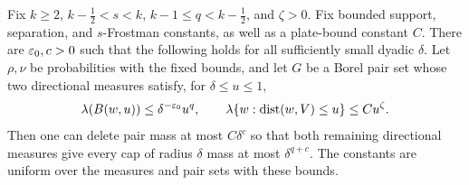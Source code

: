 \begin{lemma}\label{prep:one-scale}
Fix $k\ge2$, $k-\tfrac12<s<k$, $k-1\le q<k-\tfrac12$,
and $\zeta>0$. Fix bounded support, separation, and $s$-Frostman
constants, as well as a plate-bound constant $C$. There are $\varepsilon_0,c>0$
such that the following holds for
all sufficiently small dyadic $\delta$. Let $\rho,\nu$ be probabilities
with the fixed bounds, and let $G$ be a Borel pair set whose two
directional measures satisfy, for $\delta\le u\le1$,
\[
 \lambda(B(w,u))\le\delta^{-\varepsilon_0}u^q,
 \qquad
 \lambda\{w:\operatorname{dist}(w,V)\le u\}\le C u^\zeta.
\]
Then one can delete pair mass at most $C\delta^c$ so that both remaining
directional measures give every cap of radius $\delta$ mass at most
$\delta^{q+c}$.
The constants are uniform over the measures and pair sets with these bounds.
\end{lemma}
